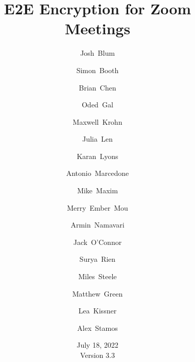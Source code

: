 \documentclass[11pt]{article}
\title{E2E Encryption for Zoom Meetings}
\author[1]{\small Josh~Blum}
\author[1]{\small Simon~Booth}
\author[1]{\small Brian~Chen}
\author[1]{\small Oded~Gal}
\author[1]{\small Maxwell~Krohn}
\author[1]{\small Julia~Len}
\author[1]{\small Karan~Lyons}
\author[1]{\small Antonio~Marcedone}
\author[1]{\small Mike~Maxim}
\author[1]{\small Merry~Ember~Mou}
\author[1]{\small Armin~Namavari}
\author[1]{\small Jack~O'Connor}
\author[1]{\small Surya~Rien}
\author[1]{\small Miles~Steele}
\author[2]{\small Matthew~Green}
\author[  \hspace{-1ex}]{\small Lea~Kissner}
\author[3]{\small Alex~Stamos}
\affil[1]{\footnotesize Zoom~Video~Communications}
\affil[2]{\footnotesize Johns~Hopkins~University}
\affil[3]{\footnotesize Stanford~University}
\date{July 18, 2022 \\ \small Version 3.3}
\begin{document}
    \null  %
    \nointerlineskip  %
    \vfill
    \let\snewpage \newpage
    \let\newpage \relax
    \maketitle
    \thispagestyle{titlepage}
    \let \newpage \snewpage
    \vfill
    \break %

    \tableofcontents
    \newpage
    \renewcommand{\thesection}{\arabic{section}}
    \renewcommand{\thesubsection}{\thesection.\arabic{subsection}}
    
    
    
    
    
    
    
    
    \pagebreak
    
    \newpage
    \appendix
    
    
\end{document}
